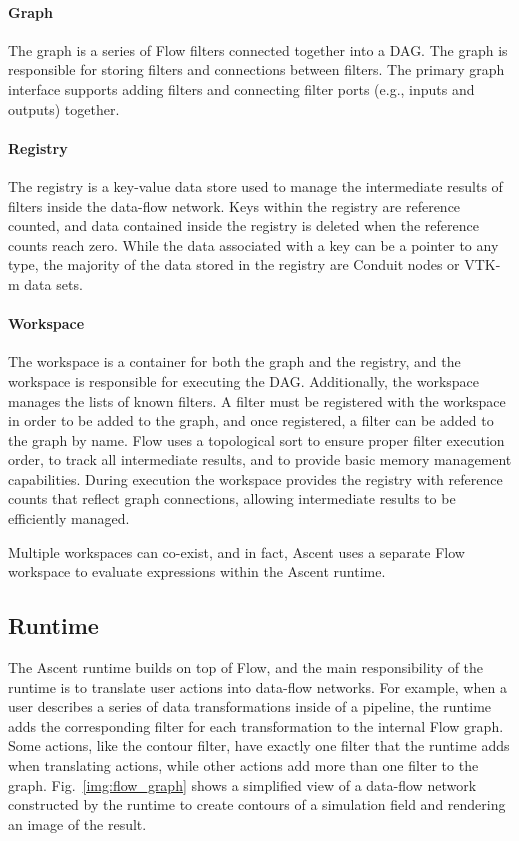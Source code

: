 \paragraph{Graph}
The graph is a series of Flow filters connected together into
a DAG.
%
The graph is responsible for storing filters and connections
between filters.
%
The primary graph interface supports adding filters and connecting
filter ports (e.g., inputs and outputs) together.

\paragraph{Registry}
The registry is a key-value data store used to manage the intermediate
results of filters inside the data-flow network.
%
Keys within the registry are reference counted, and data contained
inside the registry is deleted when the reference counts reach zero.
%
While the data associated with a key can be a pointer to any type,
the majority of the data stored in the registry are Conduit nodes
or VTK-m data sets.


\paragraph{Workspace}
The workspace is a container for both the graph and the registry,
and the workspace is responsible for executing the DAG.
%
Additionally, the workspace manages the lists of known filters.
%
A filter must be registered with the workspace in order to be added to the
graph, and once registered, a filter can be added to the graph by name.
%
Flow uses a topological sort to ensure proper filter execution order,
to track all intermediate results, and to provide basic memory management capabilities.
During execution the workspace provides the registry with reference counts that reflect graph connections, allowing intermediate results to be efficiently managed.

%
Multiple workspaces can co-exist, and in fact, Ascent uses a separate Flow workspace
to evaluate expressions within the Ascent runtime.
%

\subsection{Runtime}
The Ascent runtime builds on top of Flow, and the main responsibility of the
runtime is to translate user actions into data-flow networks.
%
For example, when a user describes a series of data transformations inside of a pipeline,
the runtime adds the corresponding filter for each transformation to
the internal Flow graph.
%
Some actions, like the contour filter, have exactly one filter that the runtime
adds when translating actions, while other actions add more than one filter to the graph.
%
Fig.~\ref{img:flow_graph} shows a simplified view of a data-flow network constructed by the
runtime to create contours of a simulation field and rendering an image of the result.
%


